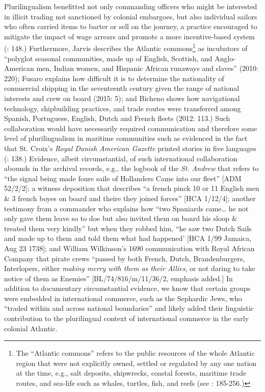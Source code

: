 Plurilingualism benefitted not only commanding officers who might be interested in illicit trading not sanctioned by colonial embargoes, but also individual sailors who often carried items to barter or sell on the journey, a practice encouraged to mitigate the impact of wage arrears and promote a more incentive-based system (\citealt{Jarvis2010}: 148.) Furthermore, Jarvis describes the Atlantic commons\footnote{The “Atlantic commons” refers to the public resources of the whole Atlantic region that were not explicitly owned, settled or regulated by any one nation at the time, e.g., salt deposits, shipwrecks, coastal forests, maritime trade routes, and sea-life such as whales, turtles, fish, and reefs (see \citealt{Jarvis2010}: 185-256.)} as incubators of “polyglot seasonal communities, made up of English, Scottish, and Anglo-American men, Indian women, and Hispanic African runaways and slaves” (2010: 220); Fusaro explains how difficult it is to determine the nationality of commercial shipping in the seventeenth century given the range of national interests and crew on board (2015: 5); and Bicheno shows how navigational technology, shipbuilding practices, and trade routes were transferred among Spanish, Portuguese, English, Dutch and French fleets (2012: 113.) Such collaboration would have necessarily required communication and therefore some level of plurilingualism in maritime communities such as evidenced in the fact that St. Croix’s \textit{Royal Danish American Gazette} printed stories in five languages (\citealt{Jarvis2010}: 138.) Evidence, albeit circumstantial, of such international collaboration abounds in the archival records, e.g., the logbook of the \textit{St. Andrew} that refers to “the signal being made foure saile of Hollanders Came into our fleet” [ADM 52/2/2]; a witness deposition that describes “a french pinck 10 or 11 English men \& 3 french boyes on board and theire they joined forces” [HCA 1/12/4]; another testimony from a commander who explains how “two Spaniards came… he not only gave them leave so to doe but also invited them on board his sloop \& treated them very kindly” but when they robbed him, “he saw two Dutch Sails and made up to them and told them what had happened’ [HCA 1/99 Jamaica, Aug 23 1738]; and William Wilkinson’s 1690 communication with Royal African Company that pirate crews “passed by both French, Dutch, Brandenburgers, Interlopers, either \textit{making merry with them as their Allies}, or not daring to take notice of them as Enemies” [BL/74/816/m/11/36/2, emphasis added.] In addition to documentary circumstantial evidence, we know that certain groups were embedded in international commerce, such as the Sephardic Jews, who “traded within and across national boundaries” \citep[20]{Jarvis2010} and likely added their linguistic contribution to the plurilingual context of international commerce in the early colonial Atlantic. 

